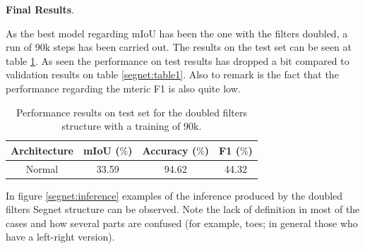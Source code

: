 \textbf{Final Results}. \newline

As the best model regarding mIoU has been the one with the filters doubled, a run of 90k steps has been carried out. The results on the test set can be seen at table \ref{segnet:table3}. As seen the performance on test results has dropped a bit compared to validation results on table \ref{segnet:table1}. Also to remark is the fact that the performance regarding the mteric F1 is also quite low.\newline


\begin{table}[h!]
  \begin{center}
    
    \begin{tabular}{|c|c|c|c|} %
      \textbf{Architecture} & \textbf{mIoU ($\%$)} & \textbf{Accuracy ($\%$)} & \textbf{F1 ($\%$)} \\
      \hline
      Normal & 33.59 & 94.62 & 44.32\\
    \end{tabular}
    \caption{Performance results on test set for the doubled filters structure with a training of 90k.}
    \label{segnet:table3}
  \end{center}
\end{table}

In figure \ref{segnet:inference} examples of the inference produced by the doubled filters Segnet structure can be observed. Note the lack of definition in most of the cases and how several parts are confused (for example, toes; in general those who have a left-right version).\newline

